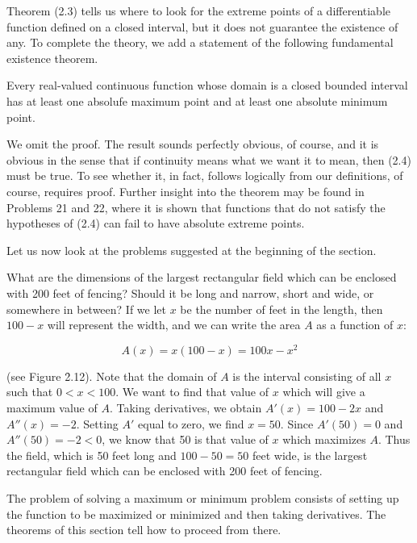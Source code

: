 Theorem (2.3) tells us where to look for the extreme points of a differentiable function defined on a closed interval, but it does not guarantee the existence of any. To complete the theory, we add a statement of the following fundamental existence theorem.

\begin{prop} %
\label{thm 2.2.4}
Every real-valued continuous function whose domain is a closed bounded interval has at least one absolufe maximum point and at least one absolute minimum point.
\end{prop}

We omit the proof. The result sounds perfectly obvious, of course, and it is obvious in the sense that if continuity means what we want it to mean, then (2.4) must be true. To see whether it, in fact, follows logically from our definitions, of course, requires proof. Further insight into the theorem may be found in Problems 21 and 22, where it is shown that functions that do not satisfy the hypotheses of (2.4) can fail to have absolute extreme points.

Let us now look at the problems suggested at the beginning of the section.
\medskip

\begin{example}
\label{exam 2.2.1}
What are the dimensions of the largest rectangular field which can be enclosed with 200 feet of fencing? Should it be long and narrow, short and wide, or somewhere in between? If we let $x$ be the number of feet in the length, then $100-x$ will represent the width, and we can write the area $A$ as a function of $x$:

$$
A(x) = x(100 - x) = 100x - x^2
$$ 


\noindent (see Figure \f{2.12}). Note that the domain of $A$ is the interval consisting of all $x$
such that $0 < x < 100$. We want to find that value of $x$ which will give a maximum value of $A$. Taking derivatives, we obtain $A'(x)= 100 - 2x$ and $A''(x)= -2$. Setting $A'$ equal to zero, we find $x= 50$. Since $A'(50) = 0$ and $A''(50) = -2 < 0$, we know that 50 is that value of $x$ which maximizes $A$. Thus the field, which is 50 feet long and $100 - 50 = 50$ feet wide, is the largest rectangular field which can be enclosed with 200 feet of fencing.
\end{example}
\medskip

The problem of solving a maximum or minimum problem consists of setting up the function to be maximized or minimized and then taking derivatives. The theorems of this section tell how to proceed from there.

